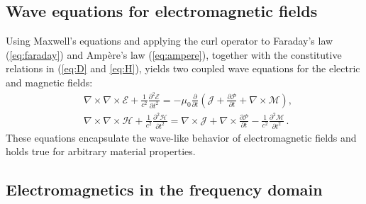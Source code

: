 \subsection*{Wave equations for electromagnetic fields}

Using Maxwell's equations and applying the curl operator to Faraday's law
    (\eqref{eq:faraday}) and Ampère's law (\eqref{eq:ampere}),
together with the constitutive relations in (\eqref{eq:D} and
        \eqref{eq:H}), yields two coupled
wave equations for the electric and magnetic fields:
\begin{equation}
    \begin{aligned}
         & \nabla \times \nabla \times \bm{\mathcal{E}}+\frac{1}{c^2}
        \frac{\partial^2 \bm{\mathcal{E}}}{\partial t^2}=-\mu_0
        \frac{\partial}{\partial t}\left(\bm{\mathcal{J}}+\frac{\partial
        \bm{\mathcal{P}}}{\partial t}+\nabla \times \bm{\mathcal{M}}\right), \\
         & \nabla \times \nabla \times \bm{\mathcal{H}}+\frac{1}{c^2}
        \frac{\partial^2 \bm{\mathcal{H}}}{\partial t^2}=\nabla \times
        \bm{\mathcal{J}}+\nabla \times \frac{\partial \bm{\mathcal{P}}}{\partial
            t}-\frac{1}{c^2} \frac{\partial^2 \bm{\mathcal{M}}}{\partial t^2}\,.
    \end{aligned}
\end{equation}
These
equations encapsulate the wave-like behavior of electromagnetic fields and
holds true for arbitrary material properties.

\subsection*{Electromagnetics in the frequency domain}

